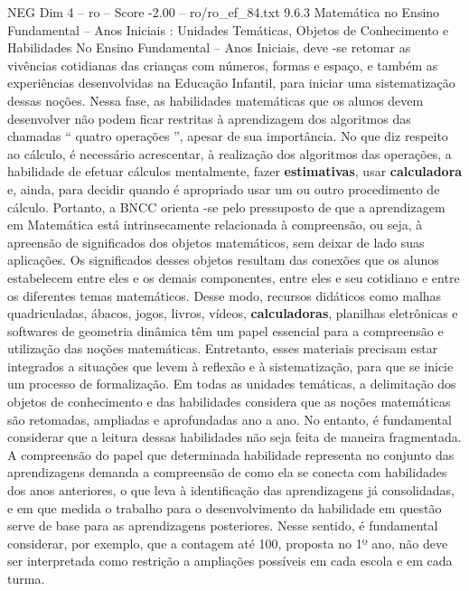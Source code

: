 \begin{textsample}{NEG Dim 4 – ro – Score -2.00 – ro/ro\_ef\_84.txt}  \label{ex:f4_neg_076}
9.6.3 Matemática no Ensino Fundamental – Anos Iniciais : Unidades Temáticas, Objetos de Conhecimento e Habilidades No Ensino Fundamental – Anos Iniciais, deve -se retomar as vivências cotidianas das crianças com números, formas e espaço, e também as experiências desenvolvidas na Educação Infantil, para iniciar uma sistematização dessas noções.
Nessa fase, as habilidades matemáticas que os alunos devem desenvolver não podem ficar restritas à aprendizagem dos algoritmos das chamadas “ quatro operações ”, apesar de sua importância.
No que diz respeito ao cálculo, é necessário acrescentar, à realização dos algoritmos das operações, a habilidade de efetuar cálculos mentalmente, fazer \textbf{estimativas}, usar \textbf{calculadora} e, ainda, para decidir quando é apropriado usar um ou outro procedimento de cálculo.
Portanto, a BNCC orienta -se pelo pressuposto de que a aprendizagem em Matemática está intrinsecamente relacionada à compreensão, ou seja, à apreensão de significados dos objetos matemáticos, sem deixar de lado suas aplicações.
Os significados desses objetos resultam das conexões que os alunos estabelecem entre eles e os demais componentes, entre eles e seu cotidiano e entre os diferentes temas matemáticos.
Desse modo, recursos didáticos como malhas quadriculadas, ábacos, jogos, livros, vídeos, \textbf{calculadoras}, planilhas eletrônicas e softwares de geometria dinâmica têm um papel essencial para a compreensão e utilização das noções matemáticas.
Entretanto, esses materiais precisam estar integrados a situações que levem à reflexão e à sistematização, para que se inicie um processo de formalização.
Em todas as unidades temáticas, a delimitação dos objetos de conhecimento e das habilidades considera que as noções matemáticas são retomadas, ampliadas e aprofundadas ano a ano.
No entanto, é fundamental considerar que a leitura dessas habilidades não seja feita de maneira fragmentada.
A compreensão do papel que determinada habilidade representa no conjunto das aprendizagens demanda a compreensão de como ela se conecta com habilidades dos anos anteriores, o que leva à identificação das aprendizagens já consolidadas, e em que medida o trabalho para o desenvolvimento da habilidade em questão serve de base para as aprendizagens posteriores.
Nesse sentido, é fundamental considerar, por exemplo, que a contagem até 100, proposta no 1º ano, não deve ser interpretada como restrição a ampliações possíveis em cada escola e em cada turma.

\end{textsample}
